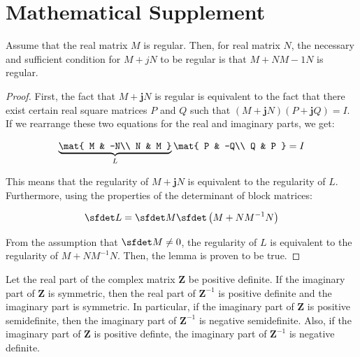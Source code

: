 \documentclass[graybox, envcountchap]{svmult}
\begin{document}
\section*{Mathematical Supplement}
\begin{lemma}\label{lem:nonsing}
Assume that the real matrix $M$ is regular. Then, for real matrix $N$, the necessary
and sufficient condition for $M + jN$ to be regular is that $M + NM-1N$ is regular.
\end{lemma}

\begin{proof}
First, the fact that $M+ \bm{j} N$ is regular is equivalent to the fact that
there exist certain real square matrices $P$ and $Q$ such that $(M+ \bm{j} N)(P+
\bm{j} Q)=I$. If we rearrange these two equations for the real and imaginary
parts, we get:

\begin{equation}\label{eq:MNinv}
  \underbrace{
  \mat{
    M & -N\\
    N & M
  }
  }_{L}
  \mat{
    P & -Q\\
    Q & P
  }
  =I
\end{equation}

This means that the regularity of $M+ \bm{j} N$ is equivalent to the regularity
of $L$. Furthermore, using the properties of the determinant of block matrices:

\begin{equation*}
  \sfdet L =\sfdet M \sfdet \left(M+NM^{-1}N\right)
\end{equation*}

From the assumption that $\sfdet M \neq 0$, the regularity of $L$ is equivalent
to the regularity of $M+NM^{-1}N$. Then, the lemma is proven to be true. 
\end{proof}

\begin{lemma}\label{lem:sdreim}
Let the real part of the complex matrix $\bm{Z}$ be positive definite. If the
imaginary part of $\bm{Z}$ is symmetric, then the real part of $\bm{Z}^{-1}$ is
positive definite and the imaginary part is symmetric. In particular, if the
imaginary part of $\bm{Z}$ is positive semidefinite, then the imaginary part of
$\bm{Z}^{-1}$ is negative semidefinite. Also, if the imaginary part of $\bm{Z}$
is positive definte, the imaginary part of $\bm{Z}^{-1}$ is negative definite.
\end{lemma}
\end{document}
